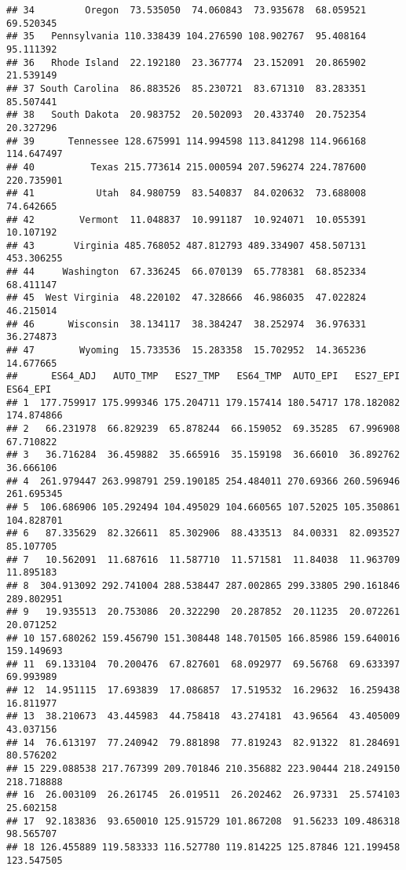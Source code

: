 \documentclass[
]{article}
\begin{document}
\begin{verbatim}
## 34         Oregon  73.535050  74.060843  73.935678  68.059521  69.520345
## 35   Pennsylvania 110.338439 104.276590 108.902767  95.408164  95.111392
## 36   Rhode Island  22.192180  23.367774  23.152091  20.865902  21.539149
## 37 South Carolina  86.883526  85.230721  83.671310  83.283351  85.507441
## 38   South Dakota  20.983752  20.502093  20.433740  20.752354  20.327296
## 39      Tennessee 128.675991 114.994598 113.841298 114.966168 114.647497
## 40          Texas 215.773614 215.000594 207.596274 224.787600 220.735901
## 41           Utah  84.980759  83.540837  84.020632  73.688008  74.642665
## 42        Vermont  11.048837  10.991187  10.924071  10.055391  10.107192
## 43       Virginia 485.768052 487.812793 489.334907 458.507131 453.306255
## 44     Washington  67.336245  66.070139  65.778381  68.852334  68.411147
## 45  West Virginia  48.220102  47.328666  46.986035  47.022824  46.215014
## 46      Wisconsin  38.134117  38.384247  38.252974  36.976331  36.274873
## 47        Wyoming  15.733536  15.283358  15.702952  14.365236  14.677665
##      ES64_ADJ   AUTO_TMP   ES27_TMP   ES64_TMP  AUTO_EPI   ES27_EPI   ES64_EPI
## 1  177.759917 175.999346 175.204711 179.157414 180.54717 178.182082 174.874866
## 2   66.231978  66.829239  65.878244  66.159052  69.35285  67.996908  67.710822
## 3   36.716284  36.459882  35.665916  35.159198  36.66010  36.892762  36.666106
## 4  261.979447 263.998791 259.190185 254.484011 270.69366 260.596946 261.695345
## 5  106.686906 105.292494 104.495029 104.660565 107.52025 105.350861 104.828701
## 6   87.335629  82.326611  85.302906  88.433513  84.00331  82.093527  85.107705
## 7   10.562091  11.687616  11.587710  11.571581  11.84038  11.963709  11.895183
## 8  304.913092 292.741004 288.538447 287.002865 299.33805 290.161846 289.802951
## 9   19.935513  20.753086  20.322290  20.287852  20.11235  20.072261  20.071252
## 10 157.680262 159.456790 151.308448 148.701505 166.85986 159.640016 159.149693
## 11  69.133104  70.200476  67.827601  68.092977  69.56768  69.633397  69.993989
## 12  14.951115  17.693839  17.086857  17.519532  16.29632  16.259438  16.811977
## 13  38.210673  43.445983  44.758418  43.274181  43.96564  43.405009  43.037156
## 14  76.613197  77.240942  79.881898  77.819243  82.91322  81.284691  80.576202
## 15 229.088538 217.767399 209.701846 210.356882 223.90444 218.249150 218.718888
## 16  26.003109  26.261745  26.019511  26.202462  26.97331  25.574103  25.602158
## 17  92.183836  93.650010 125.915729 101.867208  91.56233 109.486318  98.565707
## 18 126.455889 119.583333 116.527780 119.814225 125.87846 121.199458 123.547505

\end{verbatim}
\end{document}
